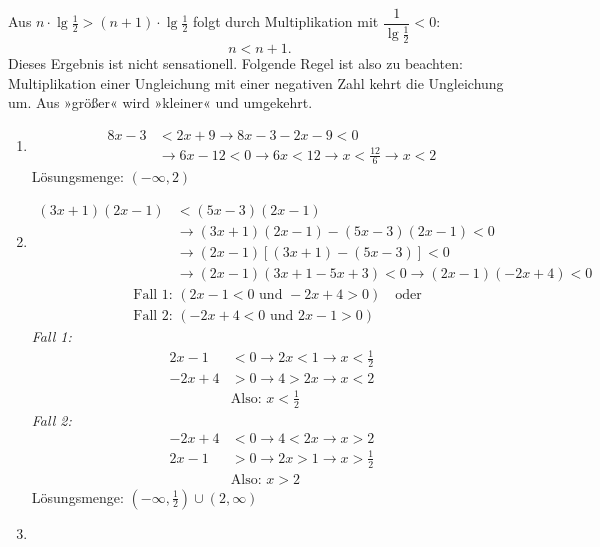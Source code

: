 Aus $n \cdot \lg\tfrac{1}{2} > (n+1) \cdot \lg\tfrac{1}{2}$ folgt durch Multiplikation mit $\dfrac{1}{\lg \tfrac{1}{2}} < 0$:
\[ n < n + 1 . \]
Dieses Ergebnis ist nicht sensationell. Folgende Regel ist also zu beachten: Multiplikation einer Ungleichung mit einer negativen Zahl kehrt die Ungleichung um. Aus »größer« wird »kleiner« und umgekehrt.

\begin{enumerate}[label=\alph*)]
  \item \begin{align*}
      8x - 3 &< 2x + 9 \rightarrow 8x - 3 - 2x - 9 < 0\\
      &\rightarrow 6x - 12 < 0 \rightarrow 6x < 12 \rightarrow x < \frac{12}{6} \rightarrow x < 2
    \end{align*}
    Lösungsmenge: $(-\infty, 2)$
  \item \begin{align*}
      (3x+1)(2x-1) &< (5x-3)(2x-1)\\
      &\rightarrow (3x+1)(2x-1) - (5x-3)(2x-1) < 0\\
      &\rightarrow (2x-1)\left[(3x+1) - (5x-3)\right] < 0\\
      &\rightarrow (2x-1)(3x+1-5x+3) < 0 \rightarrow (2x-1)(-2x+4) < 0
    \end{align*}
    \begin{align*}
      &\text{Fall 1: } (2x-1 < 0 \text{ und } -2x+4 > 0) \quad \text{oder}\\
      &\text{Fall 2: } (-2x+4 < 0 \text{ und } 2x-1 > 0)
    \end{align*}
    \textit{Fall 1:}
    \begin{align*}
      2x - 1 &< 0 \rightarrow 2x < 1 \rightarrow x < \tfrac{1}{2}\\
      -2x + 4 &> 0 \rightarrow 4 > 2x \rightarrow x < 2\\
      &\text{Also: } x < \tfrac{1}{2}
    \end{align*}
    \textit{Fall 2:}
    \begin{align*}
      -2x + 4 &< 0 \rightarrow 4 < 2x \rightarrow x > 2\\
      2x - 1 &> 0 \rightarrow 2x > 1 \rightarrow x > \tfrac{1}{2}\\
      &\text{Also: } x > 2
    \end{align*}
    Lösungsmenge: $\left(-\infty, \tfrac{1}{2}\right) \cup (2, \infty)$
  \item \begin{align*}

\end{align*}
\end{enumerate}
